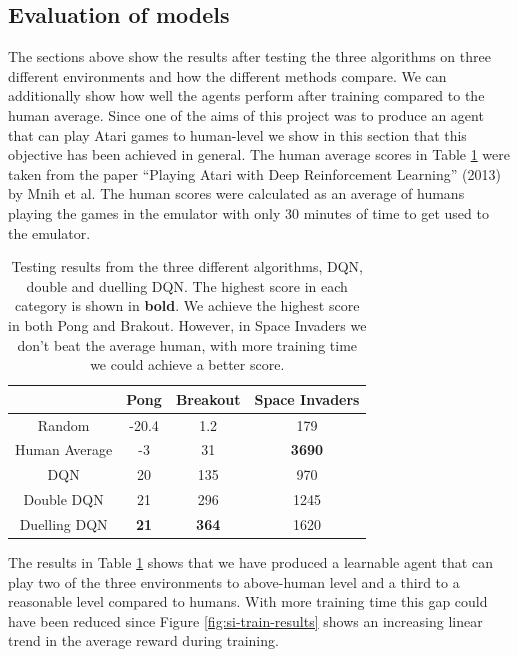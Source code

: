 \subsection{Evaluation of models}

The sections above show the results after testing the three algorithms on three different environments and how the different methods compare. We can additionally show how well the agents perform after training compared to the human average. Since one of the aims of this project was to produce an agent that can play Atari games to human-level we show in this section that this objective has been achieved in general. The human average scores in Table \ref{table:eval:testing-results} were taken from the paper ``Playing Atari with Deep Reinforcement Learning'' (2013) by Mnih et al. The human scores were calculated as an average of humans playing the games in the emulator with only 30 minutes of time to get used to the emulator.

\begin{table}[htbp]
	\centering
	\begin{tabular}{c|c|c|c|}
		\cline{2-4}
		\multicolumn{1}{l|}{}               & Pong        & Breakout     & Space Invaders \\ \hline
		\multicolumn{1}{|c|}{Random}        & -20.4       & 1.2          & 179            \\ \hline
		\multicolumn{1}{|c|}{Human Average} & -3          & 31           & \textbf{3690}  \\ \hline
		\multicolumn{1}{|c|}{DQN}           & 20          & 135          & 970            \\ \hline
		\multicolumn{1}{|c|}{Double DQN}    & 21          & 296          & 1245           \\ \hline
		\multicolumn{1}{|c|}{Duelling DQN}  & \textbf{21} & \textbf{364} & 1620           \\ \hline
	\end{tabular}
	\caption[Testing results for Standard/Double/Duelling DQN]{Testing results from the three different algorithms, DQN, double and duelling DQN. The highest score in each category is shown in \textbf{bold}. We achieve the highest score in both Pong and Brakout. However, in Space Invaders we don't beat the average human, with more training time we could achieve a better score.}\label{table:eval:testing-results}
\end{table}

The results in Table \ref{table:eval:testing-results} shows that we have produced a learnable agent that can play two of the three environments to above-human level and a third to a reasonable level compared to humans. With more training time this gap could have been reduced since Figure \ref{fig:si-train-results} shows an increasing linear trend in the average reward during training.


